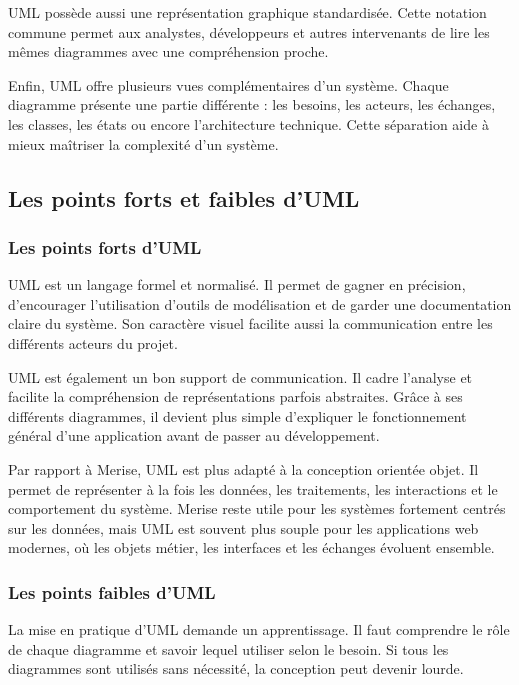 UML possède aussi une représentation graphique standardisée. Cette notation commune permet aux analystes, développeurs et autres intervenants de lire les mêmes diagrammes avec une compréhension proche.

Enfin, UML offre plusieurs vues complémentaires d’un système. Chaque diagramme présente une partie différente : les besoins, les acteurs, les échanges, les classes, les états ou encore l’architecture technique. Cette séparation aide à mieux maîtriser la complexité d’un système.

\subsection{Les points forts et faibles d’UML}
\label{subsec:points_forts_faibles_uml}

\subsubsection{Les points forts d’UML}
\label{subsubsec:points_forts_uml}

UML est un langage formel et normalisé. Il permet de gagner en précision, d’encourager l’utilisation d’outils de modélisation et de garder une documentation claire du système. Son caractère visuel facilite aussi la communication entre les différents acteurs du projet.

UML est également un bon support de communication. Il cadre l’analyse et facilite la compréhension de représentations parfois abstraites. Grâce à ses différents diagrammes, il devient plus simple d’expliquer le fonctionnement général d’une application avant de passer au développement.

Par rapport à Merise, UML est plus adapté à la conception orientée objet. Il permet de représenter à la fois les données, les traitements, les interactions et le comportement du système. Merise reste utile pour les systèmes fortement centrés sur les données, mais UML est souvent plus souple pour les applications web modernes, où les objets métier, les interfaces et les échanges évoluent ensemble.

\subsubsection{Les points faibles d’UML}
\label{subsubsec:points_faibles_uml}

La mise en pratique d’UML demande un apprentissage. Il faut comprendre le rôle de chaque diagramme et savoir lequel utiliser selon le besoin. Si tous les diagrammes sont utilisés sans nécessité, la conception peut devenir lourde.

